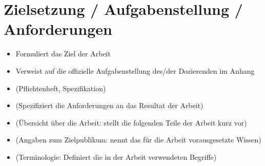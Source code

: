 \section{Zielsetzung / Aufgabenstellung / Anforderungen}\label{zielsetzung}

\begin{itemize}
\item Formuliert das Ziel der Arbeit
\item Verweist auf die offizielle Aufgabenstellung des/der Dozierenden im Anhang
\item (Pflichtenheft, Spezifikation)
\item (Spezifiziert die Anforderungen an das Resultat der Arbeit)
\item (Übersicht über die Arbeit: stellt die folgenden Teile der Arbeit kurz vor)
\item (Angaben zum Zielpublikum: nennt das für die Arbeit vorausgesetzte Wissen)
\item (Terminologie: Definiert die in der Arbeit verwendeten Begriffe)
\end{itemize}

